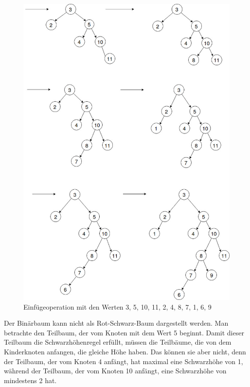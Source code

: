 \documentclass{article}
\begin{document}
	\newpage
	\begin{figure}[h!]
		\centering
		\includegraphics[width=\linewidth]{binaryTree1.jpg}
		\caption{Einfügeoperation mit den Werten 3, 5, 10, 11, 2, 4, 8, 7, 1, 6, 9}
	\end{figure}
	
	\newpage
	Der Binärbaum kann nicht als Rot-Schwarz-Baum dargestellt werden. Man betrachte den Teilbaum, der vom Knoten mit dem Wert 5 beginnt. Damit dieser Teilbaum die Schwarzhöhenregel erfüllt, müssen die Teilbäume, die von dem Kinderknoten anfangen, die gleiche Höhe haben. Das können sie aber nicht, denn der Teilbaum, der vom Knoten 4 anfängt, hat maximal eine Schwarzhöhe von 1, während der Teilbaum, der vom Knoten 10 anfängt, eine Schwarzhöhe von mindestens 2 hat. 
\end{document}
